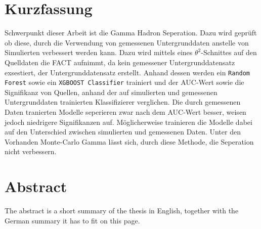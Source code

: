 \thispagestyle{plain}

\section*{Kurzfassung}
Schwerpunkt dieser Arbeit ist die Gamma Hadron Seperation. 
Dazu wird geprüft ob diese, durch die Verwendung von gemessenen Untergrunddaten anstelle von Simulierten verbessert werden kann. 
Dazu wird mittels eines $\theta^{2}$-Schnittes auf den Quelldaten die FACT aufnimmt, da kein gemessener Untergrunddatensatz exsestiert, der Untergrunddatensatz erstellt.
Anhand dessen werden ein \texttt{Random Forest} sowie ein \texttt{XGBOOST Classifier} trainiert und der AUC-Wert sowie die Signifikanz von Quellen, anhand der auf simulierten und gemessenen Untergrunddaten trainierten Klassifizierer verglichen. 
Die durch gemessenen Daten tranierten Modelle seperieren zwar nach dem AUC-Wert besser, weisen jedoch niedrigere Signifikanzen auf. 
Möglicherweise trainieren die Modelle dabei auf den Unterschied zwischen simulierten und gemessenen Daten. 
Unter den Vorhanden Monte-Carlo Gamma lässt sich, durch diese Methode, die Seperation nicht verbessern. 
\section*{Abstract}
\begin{english}
The abstract is a short summary of the thesis in English, together with the German summary it has to fit on this page.
\end{english}
